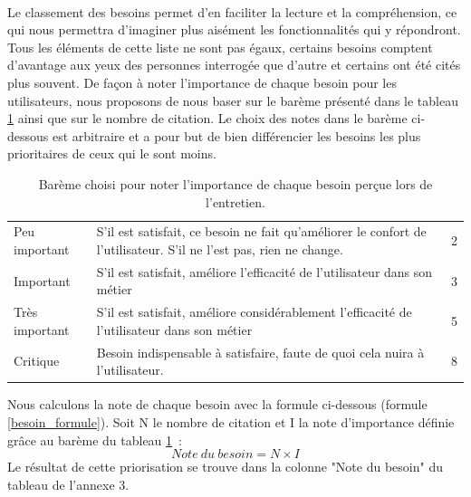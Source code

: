 			\paragraph{}%
			Le classement des besoins permet d'en faciliter la lecture et la
			compréhension, ce qui nous permettra d'imaginer plus aisément les
			fonctionnalités qui y répondront. Tous les éléments de cette
			liste ne sont pas égaux, certains besoins comptent d'avantage aux yeux des
			personnes interrogée que d'autre et certains ont été cités plus
			souvent.\newline
			De façon à noter l'importance de chaque besoin pour les utilisateurs, nous
			proposons de nous baser sur le barème présenté dans le tableau
			\ref{bareme_besoins} ainsi que sur le nombre de citation. Le choix des notes
			dans le barème ci-dessous est arbitraire et a pour but
			de bien différencier les besoins les plus prioritaires de ceux qui le sont moins.
			\begin{table}[H]
				\centering
				\begin{tabular}{| p{4cm} | p{8cm} | p{2cm} |}
					\hline
						\thead{Priorité}
						&\thead{Description}
						&\thead{Note}
						\\
					\hline
						Peu important
						&
						S'il est satisfait, ce besoin ne fait qu'améliorer le confort de l'utilisateur. S'il ne l'est pas, rien ne change.
						&
						2
						\\
					\hline
						Important
						&
						S'il est satisfait, améliore l'efficacité de l'utilisateur dans son métier
						&
						3
						\\
					\hline
						Très important
						&
						S'il est satisfait, améliore considérablement l'efficacité de l'utilisateur dans son métier
						&
						5
						\\
					\hline
						Critique
						&
						Besoin indispensable à satisfaire, faute de quoi cela nuira à l'utilisateur.
						&
						8
						\\
					\hline
				\end{tabular}
				\caption{\label{bareme_besoins} Barème choisi pour noter l'importance de
				chaque besoin perçue lors de l'entretien.}
			\end{table}
			Nous calculons la note de chaque besoin avec la formule ci-dessous
			(formule \ref{besoin_formule}).
			Soit N le nombre de citation et I la note d'importance définie grâce au
			barème du tableau \ref{bareme_besoins}~:
			\begin{equation}
				\label{besoin_formule}
				Note\ du\ besoin=N\times I
			\end{equation}
			Le résultat de cette priorisation se trouve dans la colonne "Note du besoin"
			du tableau de l'annexe 3.
	
